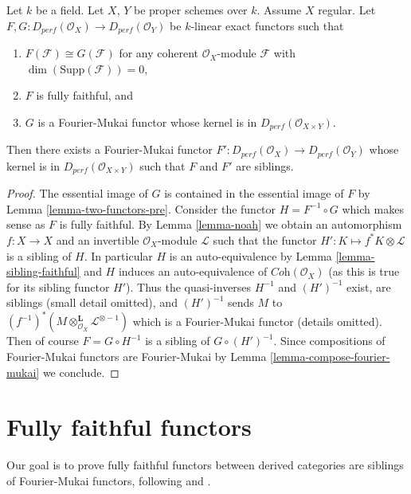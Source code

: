 \begin{lemma}
\label{lemma-two-functors}
Let $k$ be a field. Let $X$, $Y$ be proper schemes over $k$.
Assume $X$ regular.
Let $F, G : D_{perf}(\mathcal{O}_X) \to D_{perf}(\mathcal{O}_Y)$
be $k$-linear exact functors such that
\begin{enumerate}
\item $F(\mathcal{F}) \cong G(\mathcal{F})$ for any coherent
$\mathcal{O}_X$-module $\mathcal{F}$ with $\dim(\text{Supp}(\mathcal{F})) = 0$,
\item $F$ is fully faithful, and
\item $G$ is a Fourier-Mukai functor whose kernel is in
$D_{perf}(\mathcal{O}_{X \times Y})$.
\end{enumerate}
Then there exists a Fourier-Mukai functor
$F' : D_{perf}(\mathcal{O}_X) \to D_{perf}(\mathcal{O}_Y)$
whose kernel is in $D_{perf}(\mathcal{O}_{X \times Y})$
such that $F$ and $F'$ are siblings.
\end{lemma}

\begin{proof}
The essential image of $G$ is contained in the essential
image of $F$ by Lemma \ref{lemma-two-functors-pre}.
Consider the functor $H = F^{-1} \circ G$
which makes sense as $F$ is fully faithful.
By Lemma \ref{lemma-noah} we obtain an automorphism $f : X \to X$
and an invertible $\mathcal{O}_X$-module $\mathcal{L}$ such that
the functor $H' : K \mapsto f^*K \otimes \mathcal{L}$
is a sibling of $H$. In particular
$H$ is an auto-equivalence by Lemma \ref{lemma-sibling-faithful}
and $H$ induces an auto-equivalence of
$\textit{Coh}(\mathcal{O}_X)$ (as this is true for its sibling functor $H'$).
Thus the quasi-inverses $H^{-1}$ and $(H')^{-1}$ exist, are siblings
(small detail omitted), and $(H')^{-1}$ sends $M$ to
$(f^{-1})^*(M \otimes_{\mathcal{O}_X}^\mathbf{L} \mathcal{L}^{\otimes -1})$
which is a Fourier-Mukai functor (details omitted).
Then of course $F = G \circ H^{-1}$ is a sibling of
$G \circ (H')^{-1}$. Since compositions of Fourier-Mukai
functors are Fourier-Mukai by
Lemma \ref{lemma-compose-fourier-mukai}
we conclude.
\end{proof}





\section{Fully faithful functors}
\label{section-fully-faithful}

\noindent
Our goal is to prove fully faithful functors between derived categories
are siblings of Fourier-Mukai functors, following
\cite{Orlov-K3} and \cite{Ballard}.


